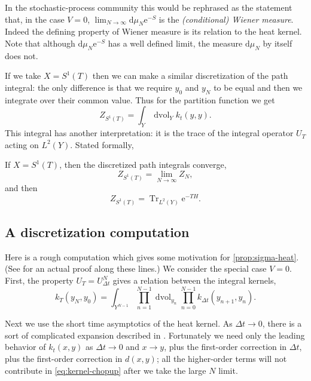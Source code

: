 \documentclass[12pt,letterpaper,reqno]{article}
\numberwithin{equation}{section}
\newcommand{\e}{{\mathrm e}}
\newcommand{\de}{\mathrm{d}}
\newcommand{\ti}[1]{\textit{#1}}
\DeclareMathOperator{\dvol}{dvol}
\DeclareMathOperator{\Tr}{Tr}
\begin{document}
In the stochastic-process community this would be rephrased
as the statement that, in the case $V = 0$, 
$\lim_{N \to \infty} \de \mu_N \e^{-S}$ is the
\ti{(conditional) Wiener measure}. Indeed the defining
property of Wiener measure is its relation to the heat 
kernel. Note that although $\de \mu_N \e^{-S}$ 
has a well defined
limit, the measure $\de \mu_N$ by itself does not.

If we take $X = S^1(T)$ then we can make a similar 
discretization of the path integral: the only difference is that we require
$y_0$ and $y_N$ to be equal and then we integrate over their
common value. Thus for the partition function we get
\begin{equation}
Z_{S^1(T)} = \int_Y \dvol_Y k_t(y,y).
\end{equation}
This integral has another interpretation: it is the trace
of the integral operator $U_T$ acting on $L^2(Y)$.
Stated formally,
\begin{prop}
If $X = S^1(T)$, then the discretized path integrals converge,
\begin{equation}
  Z_{S^1(T)} = \lim_{N \to \infty} Z_N,
\end{equation}
and then
\begin{equation}
  Z_{S^1(T)} = \Tr_{L^2(Y)} \e^{-T H}.
\end{equation}
\end{prop}


\subsection{A discretization computation}

Here is a rough computation which gives some
motivation for \autoref{prop:sigma-heat}.
(See \cite{Baer2007} for an actual proof along these lines.)
We consider the special case $V = 0$.
First, the property $U_T = U_{\Delta t}^N$ gives a 
relation between the integral kernels,
\begin{equation} \label{eq:kernel-chopup}
  k_T(y_N, y_0) = \int_{Y^{N-1}} \prod_{n=1}^{N-1} \dvol_{y_n} \prod_{n=0}^{N-1} k_{\Delta t} (y_{n+1}, y_n).
\end{equation}

Next we use the short time asymptotics of
the heat kernel. As $\Delta t \to 0$, there is a sort of complicated
expansion described in \cite{Berline2004}. Fortunately we need only the leading behavior
of $k_t(x,y)$ as $\Delta t \to 0$ and $x \to y$,
plus the first-order correction in $\Delta t$, plus the first-order correction
in $d(x,y)$; all the higher-order terms will not contribute 
in \eqref{eq:kernel-chopup} after we take the large $N$ limit.
\end{document}
